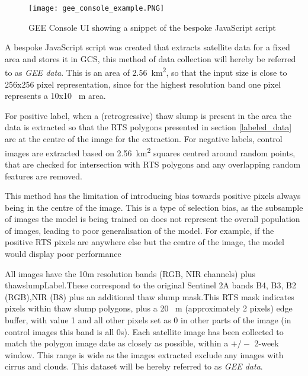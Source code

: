     \begin{figure}[hbt!]
        \centering
        \texttt{[image: gee\_console\_example.PNG]}
        \caption{\gls{GEE} Console \gls{UI} showing a snippet of the bespoke JavaScript script}
        \label{gee_console_ui}
    \end{figure}

A bespoke JavaScript script was created that extracts satellite data for a fixed area and stores it in \gls{GCS}, this method of data collection will hereby be referred to as \textit{\gls{GEE} data}. This is an area of \SI{2.56}{\kilo\metre\squared}, so that the input size is close to 256x256 pixel representation, since for the highest resolution band one pixel represents a 10x10 \SI{}{\metre} area.

For positive label, when a (retrogressive) thaw slump is present in the area the data is extracted so that the \gls{RTS} polygons presented in section \ref{labeled_data} are at the centre of the image for the extraction.
For negative labels, control images are extracted based on \SI{2.56}{\kilo\metre\squared} squares centred around random points, that are checked for intersection with \gls{RTS} polygons and any overlapping random features are removed. 

This method has the limitation of introducing bias towards positive pixels always being in the centre of the image. This is a type of selection bias, as the subsample of images the model is being trained on does not represent the overall population of images, leading to poor generalisation of the model. For example, if the positive \gls{RTS} pixels are anywhere else but the centre of the image, the model would display poor performance

All images have the 10m resolution bands (\gls{RGB}, \gls{NIR} channels) plus thawslumpLabel.These correspond to the original Sentinel 2A bands B4, B3, B2 (\gls{RGB}),\gls{NIR} (B8) plus an additional thaw slump mask.This \gls{RTS} mask indicates pixels within thaw slump polygons, plus a 20 \SI{}{\metre} (approximately 2 pixels) edge buffer, with value 1 and all other pixels set as 0 in other parts of the image (in control images this band is all 0s).
Each satellite image has been collected to match the polygon image date as closely as possible, within a $+/-$ 2-week window. This range is wide as the images extracted exclude any images with cirrus and clouds. This dataset will be hereby referred to as \textit{\gls{GEE} data}.

